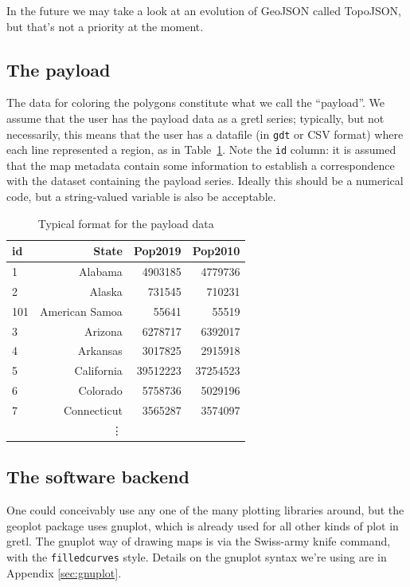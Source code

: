 \documentclass{article}
\begin{document}
In the future we may take a look at an evolution of GeoJSON called
TopoJSON, but that's not a priority at the moment.

\subsection{The payload}
\label{sec:payload}

The data for coloring the polygons constitute what we call the
``payload''. We assume that the user has the payload data as a gretl
series; typically, but not necessarily, this means that the user has a
datafile (in \texttt{gdt} or CSV format) where each line represented a
region, as in Table~\ref{tab:payload}. Note the \texttt{id} column: it
is assumed that the map metadata contain some information to establish
a correspondence with the dataset containing the payload series.
Ideally this should be a numerical code, but a string-valued variable
is also be acceptable.


\begin{table}[htbp]
\begin{center}
\begin{tabular}{lrrr}
  \hline
  \textbf{id}	& \textbf{State}& \textbf{Pop2019} & \textbf{Pop2010} \\
  \hline
  1	& Alabama	& 4903185	& 4779736  \\ 
  2     & Alaska	& 731545	& 710231   \\ 
  101   & American Samoa	& 55641	& 55519	  \\ 
  3	& Arizona	& 6278717	& 6392017  \\ 
  4	& Arkansas	& 3017825	& 2915918  \\ 
  5	& California	& 39512223	& 37254523 \\ 
  6	& Colorado	& 5758736	& 5029196  \\ 
  7	& Connecticut	& 3565287	& 3574097  \\
                & \vdots & \\
  \hline
\end{tabular}
\end{center}
\caption{Typical format for the payload data}
\label{tab:payload}
\end{table}


\subsection{The software backend}
\label{sec:software}

One could conceivably use any one of the many plotting libraries
around, but the \textsf{geoplot} package uses \textsf{gnuplot}, which
is already used for all other kinds of plot in gretl.  The gnuplot way
of drawing maps is via the Swiss-army knife  command, with
the \texttt{filledcurves} style. Details on the gnuplot syntax we're
using are in Appendix \ref{sec:gnuplot}.
\end{document}
